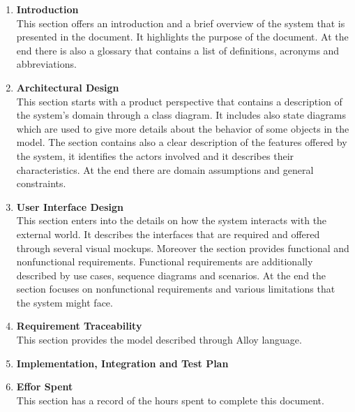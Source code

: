 \begin{enumerate}
    \item \textbf{Introduction}\\
            This section offers an introduction and a brief overview of the system that is presented in the document. 
            It highlights the purpose of the document.
            At the end there is also a glossary that contains a list of definitions, acronyms and abbreviations.
            
    \item \textbf{Architectural Design}\\
            This section starts with a product perspective that contains a description of the system's domain through a class diagram. 
            It includes also state diagrams which are used to give more details about the behavior of some objects in the model.
            The section contains also a clear description of the features offered by the system, 
            it identifies the actors involved and it describes their characteristics.
            At the end there are domain assumptions and general constraints.
            
    
    \item \textbf{User Interface Design}\\
            This section enters into the details on how the system interacts with the external world. It describes 
            the interfaces that are required and offered through several visual mockups. 
            Moreover the section provides functional and nonfunctional requirements. Functional
            requirements are additionally described by use cases, sequence diagrams and scenarios.
            At the end the section focuses on nonfunctional requirements and various limitations that the system might face.

    \item \textbf{Requirement Traceability}\\
            This section provides the model described through Alloy language.
            
    \item \textbf{Implementation, Integration and Test Plan}\\
            
    \item \textbf{Effor Spent}\\
            This section has a record of the hours spent to complete this document.

\end{enumerate}